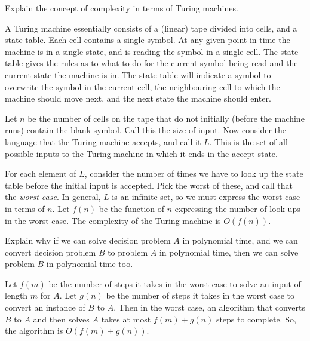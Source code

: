 \documentclass[a4paper, 12pt]{exam}
\begin{document}
\begin{questions}
\begin{solution}
  \end{solution}


\question
  Explain the concept of complexity in terms of Turing machines.
  \begin{solution}
    A Turing machine essentially consists of a (linear) tape divided into cells, and a state table.
    Each cell contains a single symbol.
    At any given point in time the machine is in a single state, and is reading the symbol in a single cell.
    The state table gives the rules as to what to do for the current symbol being read and the current state the machine is in.
    The state table will indicate a symbol to overwrite the symbol in the current cell, the neighbouring cell to which the machine should move next, and the next state the machine should enter.

    Let \( n \) be the number of cells on the tape that do not initially (before the machine runs) contain the blank symbol.
    Call this the size of input.
    Now consider the language that the Turing machine accepts, and call it \( L \).
    This is the set of all possible inputs to the Turing machine in which it ends in the accept state.
    
    For each element of \( L \), consider the number of times we have to look up the state table before the initial input is accepted.
    Pick the worst of these, and call that the \emph{worst case}.
    In general, \( L \) is an infinite set, so we must express the worst case in terms of \( n \).
    Let \( f(n) \) be the function of \( n \) expressing the number of look-ups in the worst case.
    The complexity of the Turing machine is \( O(f(n)) \).
  \end{solution}


\question
  Explain why if we can solve decision problem \( A \) in polynomial time, and we can convert decision problem \( B \) to problem \( A \) in polynomial time, then we can solve problem \( B \) in polynomial time too.
  \begin{solution}
    Let \( f(m) \) be the number of steps it takes in the worst case to solve an input of length \( m \) for \( A \).
    Let \( g(n) \) be the number of steps it takes in the worst case to convert an instance of \( B \) to \( A \).
    Then in the worst case, an algorithm that converts \( B \) to \( A \) and then solves \( A \) takes at most \( f(m)+g(n) \) steps to complete.
    So, the algorithm is \( O(f(m)+g(n)) \).


\end{solution}
\end{questions}
\end{document}
